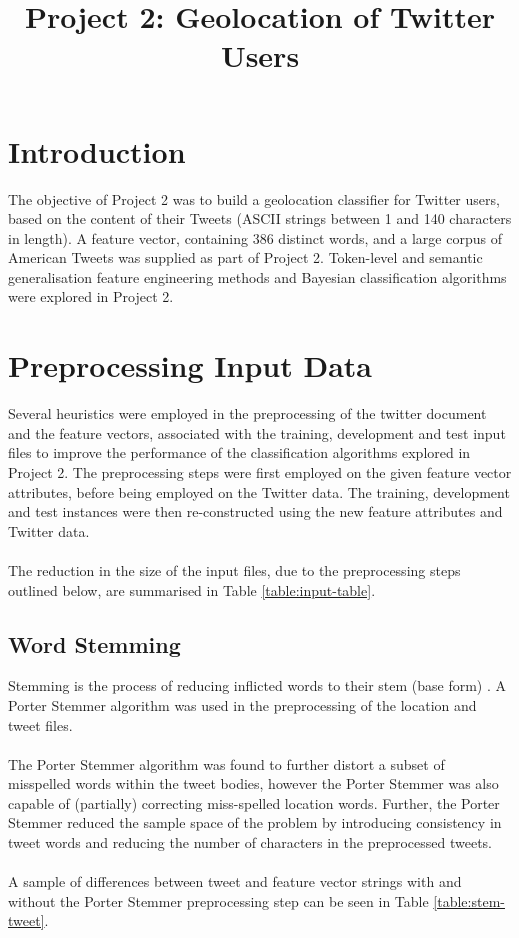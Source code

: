\documentclass[11pt]{article}
\begin{document}
\title{Project 2: Geolocation of Twitter Users}
\maketitle

\section{Introduction}
The objective of Project 2 was to build a geolocation classifier for Twitter users, based on the content of their Tweets (ASCII strings between 1 and 140 characters in length). A feature vector, containing 386 distinct words, and a large corpus of American Tweets was supplied as part of Project 2. Token-level and semantic generalisation feature engineering methods and Bayesian classification algorithms were explored in Project 2.

\section{Preprocessing Input Data}  

Several heuristics were employed in the preprocessing of the twitter document and the feature vectors, associated with the training, development and test input files to improve the performance of the classification algorithms explored in Project 2. The preprocessing steps were first employed on the given feature vector attributes, before being employed on the Twitter data. The training, development and test instances were then re-constructed using the new feature attributes and Twitter data.\\\\
The reduction in the size of the input files, due to the preprocessing steps outlined below, are summarised in Table \ref{table:input-table}.

\subsection{Word Stemming}

Stemming is the process of reducing inflicted words to their stem (base form) \citep{pm-stem}. A Porter Stemmer algorithm was used in the preprocessing of the location and tweet files. \\\\
The Porter Stemmer algorithm was found to further distort a subset of misspelled words within the tweet bodies, however the Porter Stemmer was also capable of (partially) correcting miss-spelled location words. Further, the Porter Stemmer reduced the sample space of the problem by introducing consistency in tweet words and reducing the number of characters in the preprocessed tweets.\\\\
A sample of differences between tweet and feature vector strings with and without the Porter Stemmer preprocessing step can be seen in Table \ref{table:stem-tweet}.
   
\end{document}
